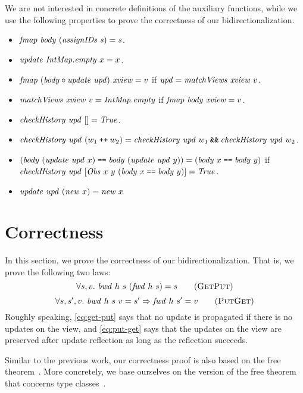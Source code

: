 \documentclass{article}
\theoremstyle{definition}
\newcommand{\texteq}{\mathrel{\texttt{==}}}
\newcommand{\APPEND}{\mathbin{\texttt{++}}}
\begin{document}
We are not interested in concrete definitions of the auxiliary functions, while
we use the following properties to prove the correctness of our 
bidirectionalization.
\begin{itemize}
 \item $\mathit{fmap}~\mathit{body}~(\mathit{assignIDs}~\mathit{s}) = \mathit{s}$.
 \item $\mathit{update}~\mathit{IntMap.empty}~x = x$. 
 \item $\mathit{fmap}~(\mathit{body} \circ \mathit{update}~\mathit{upd})~\mathit{xview} = v$
    if $\mathit{upd} = \mathit{matchViews}~\mathit{xview}~v$. 
 \item  
     $\mathit{matchViews}~\mathit{xview}~v = \mathit{IntMap.empty}$
   if $\mathit{fmap}~\mathit{body}~\mathit{xview} = v$. 
 \item $\mathit{checkHistory}~\mathit{upd}~[] = \mathit{True}$.
 \item $\mi{checkHistory}~\mi{upd}~(w_1 \APPEND w_2) = \mi{checkHistory}~\mi{upd}~w_1 \mathbin{\texttt{\&\&}} \mi{checkHistory}~\mi{upd}~w_2$.
 \item $(\mi{body}~(\mi{update}~\mi{upd}~x) \texteq \mi{body}~(\mi{update}~\mi{upd}~y)) = (\mi{body}~x \texteq \mi{body}~y)$
    if $\mi{checkHistory}~\mi{upd}~[\mi{Obs}~x~y~(\mi{body}~x \texteq \mi{body}~y)] = \mi{True}$.
 \item $\mathit{update}~\mathit{upd}~(\mathit{new}~x) = \mathit{new}~x$
\end{itemize}


\section{Correctness}
In this section, we prove the correctness of our bidirectionalization.
That is, we prove the following two laws:
\[
  \forall s,v.~ \mi{bwd}~h~s~(\mi{fwd}~h~s) = s \tag{\textsc{GetPut}}
  \label{eq:get-put}
\]
\[
\forall s,s',v.~ \mi{bwd}~h~s~v = s' \Rightarrow \mi{fwd}~h~s' = v \tag{\textsc{PutGet}}
 \label{eq:put-get}
\]
Roughly speaking, \ref{eq:get-put} says that no update is propagated if there is no updates on the view, and \ref{eq:put-get} says that the updates on the view are preserved after update reflection as long as the reflection succeeds. 


Similar to the previous work, our correctness proof is also based on the free theorem~\cite{Wadler89}. More concretely, we base ourselves on the version of the free theorem that concerns type classes~\cite{Voigtlander09ft}.
\end{document}

